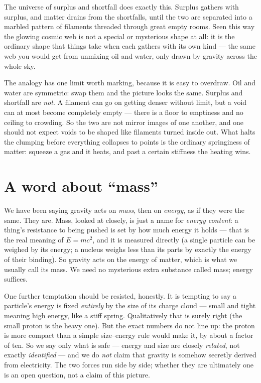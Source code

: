 \documentclass[11pt]{article}
\begin{document}
The universe of surplus and shortfall does exactly this. Surplus gathers with surplus, and matter drains from the
shortfalls, until the two are separated into a marbled pattern of filaments threaded through great empty rooms.
Seen this way the glowing cosmic web is not a special or mysterious shape at all: it is the ordinary shape that
things take when each gathers with its own kind --- the same web you would get from unmixing oil and water, only
drawn by gravity across the whole sky.

The analogy has one limit worth marking, because it is easy to overdraw. Oil and water are symmetric: swap them
and the picture looks the same. Surplus and shortfall are \emph{not}. A filament can go on getting denser without
limit, but a void can at most become completely empty --- there is a floor to emptiness and no ceiling to
crowding. So the two are not mirror images of one another, and one should not expect voids to be shaped like
filaments turned inside out. What halts the clumping before everything collapses to points is the ordinary
springiness of matter: squeeze a gas and it heats, and past a certain stiffness the heating wins.

\section*{A word about ``mass''}
We have been saying gravity acts on \emph{mass}, then on \emph{energy}, as if they were the same. They are. Mass,
looked at closely, is just a name for \emph{energy content}: a thing's resistance to being pushed is set by how
much energy it holds --- that is the real meaning of $E=mc^2$, and it is measured directly (a single particle can
be weighed by its energy; a nucleus weighs less than its parts by exactly the energy of their binding). So gravity
acts on the energy of matter, which is what we usually call its mass. We need no mysterious extra substance called
mass; energy suffices.

One further temptation should be resisted, honestly. It is tempting to say a particle's energy is fixed
\emph{entirely} by the size of its charge cloud --- small and tight meaning high energy, like a stiff spring.
Qualitatively that is surely right (the small proton is the heavy one). But the exact numbers do not line up: the
proton is more compact than a simple size--energy rule would make it, by about a factor of ten. So we say only what
is safe --- energy and size are closely \emph{related}, not exactly \emph{identified} --- and we do \emph{not}
claim that gravity is somehow secretly derived from electricity. The two forces run side by side; whether they are
ultimately one is an open question, not a claim of this picture.
\end{document}
